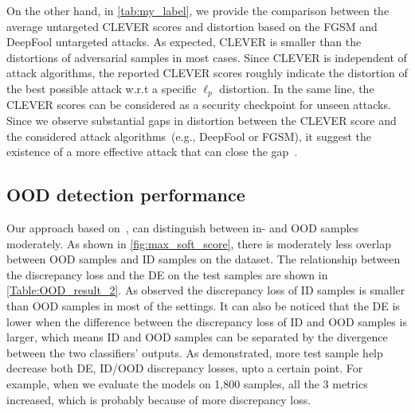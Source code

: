 \hspace*{3.5mm} On the other hand, in \cref{tab:my_label}, we provide the comparison between the average untargeted CLEVER scores and distortion based on the FGSM and DeepFool untargeted attacks. As expected, CLEVER is smaller than the distortions of adversarial samples in most cases. 
Since CLEVER is independent of attack algorithms, the reported CLEVER scores roughly indicate the distortion of the best possible attack w.r.t a specific $\ell_{p}$ distortion. In the same line, the CLEVER scores can be considered as a security checkpoint for unseen attacks. Since we observe substantial gaps in distortion between the CLEVER score and the considered attack algorithms~(e.g., DeepFool or FGSM), it suggest the existence of a more effective attack that can close the gap~\cite{weng2018evaluating}.

\subsection{OOD detection performance}
Our approach based on~\cite{OOD19}, can distinguish between in- and OOD samples moderately. As shown in \cref{fig:max_soft_score}, there is moderately less overlap between OOD samples and ID samples on the dataset. The relationship between the discrepancy loss and the DE on the test samples are shown in \cref{Table:OOD_result_2}. As observed the discrepancy loss of ID samples is smaller than OOD samples in most of the settings. It can also be noticed that the DE is lower when the difference between the discrepancy loss of ID and OOD samples is larger, which means ID and OOD samples can be separated by the divergence between the two classifiers’ outputs. As demonstrated, more test sample help decrease both DE, ID/OOD discrepancy losses, upto a certain point. For example, when we evaluate the models on 1,800 samples, all the 3 metrics increased, which is probably because of more discrepancy loss. 

